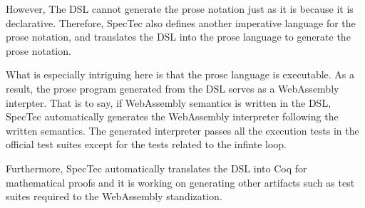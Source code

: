 However, The DSL cannot generate the prose notation just as it is because it is
declarative.
Therefore, SpecTec also defines another imperative language for the prose
notation, and translates the DSL into the prose language to generate the prose
notation.


What is especially intriguing here is that the prose language is executable.
As a result, the prose program generated from the DSL serves as a WebAssembly
interpter.
That is to say, if WebAssembly semantics is written in the DSL, SpecTec
automatically generates the WebAssembly interpreter following the written
semantics.
The generated interpreter passes all the execution tests in the official test
suites except for the tests related to the infinte loop.


Furthermore, SpecTec automatically translates the DSL into Coq\cite{il2coq} for
mathematical proofs and it is working on generating other artifacts such as
test suites required to the WebAssembly standization.









